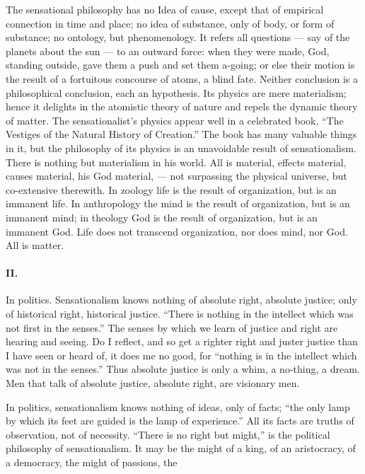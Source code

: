 \documentclass[12pt]{article}
\begin{document}
The sensational philosophy has no Idea of cause, except that of empirical connection in time and place; no 
idea of substance, only of body, or form of substance; 
no ontology, but phenomenology. It refers all questions --- say of the planets about the sun --- to an outward force: when they were made, God, standing outside, gave them a push and set them a-going; or else 
their motion is the result of a fortuitous concourse of 
atoms, a blind fate. Neither conclusion is a philosophical conclusion, each an hypothesis. Its physics 
are mere materialism; hence it delights in the atomistic 
theory of nature and repels the dynamic theory of 
matter. The sensationalist's physics appear well in a 
celebrated book, ``The Vestiges of the Natural History of Creation.'' The book has many valuable 
things in it, but the philosophy of its physics is an 
unavoidable result of sensationalism. There is nothing but materialism in his world. All is material, effects material, causes material, his God material, ---
not surpassing the physical universe, but co-extensive 
therewith. In zoology life is the result of organization, but is an immanent life. In anthropology the 
mind is the result of organization, but is an immanent mind; in theology God is the result of organization, but is an immanent God. Life does not transcend 
organization, nor does mind, nor God. All is matter. 

\paragraph{II.} In politics. Sensationalism knows nothing of absolute right, absolute justice; only of historical right, 
historical justice. ``There is nothing in the intellect 
which was not first in the senses.'' The senses by 
which we learn of justice and right are hearing and 
seeing. Do I reflect, and so get a righter right and 
juster justice than I have seen or heard of, it does me 
no good, for ``nothing is in the intellect which was 
not in the senses.'' Thus absolute justice is only a 
whim, a no-thing, a dream. Men that talk of absolute justice, absolute right, are visionary men. 

In politics, sensationalism knows nothing of ideas, 
only of facts; ``the only lamp by which its feet are 
guided is the lamp of experience.'' All its facts are 
truths of observation, not of necessity. ``There is no 
right but might,'' is the political philosophy of sensationalism. It may be the might of a king, of an aristocracy, of a democracy, the might of passions, the 
\end{document}
